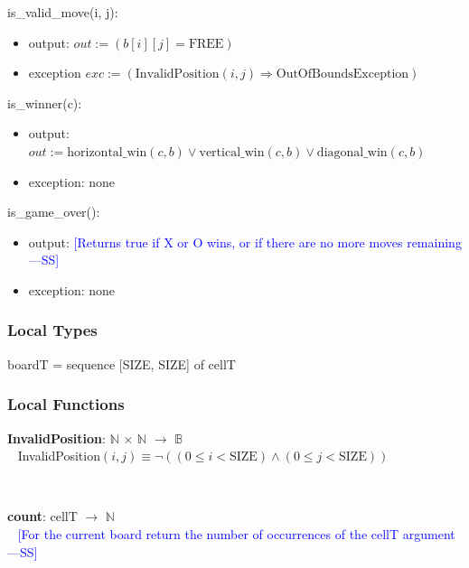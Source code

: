 \documentclass[12pt,fleqn]{examtst}
\newcommand{\authornote}[3]{\textcolor{#1}{[#3 ---#2]}}
\newcommand{\authornote}[3]{}
\newcommand{\wss}[1]{\authornote{blue}{SS}{#1}}
\begin{document}
\noindent is\_valid\_move(i, j):
\begin{itemize}
\item output: $\mathit{out} := (b[i][j] = \mbox{FREE})$ 
\item exception $exc := (\mbox{InvalidPosition}(i, j) \Rightarrow \mbox{OutOfBoundsException})$
\end{itemize}

\noindent is\_winner(c):
\begin{itemize}
\item output: $\mathit{out} := \mbox{horizontal\_win}(c, b) \vee \mbox{vertical\_win}(c, b) \vee
\mbox{diagonal\_win}(c, b)$ 
\item exception: none
\end{itemize}

\noindent is\_game\_over():
\begin{itemize}
\item output: \wss{Returns true if X or O wins, or if there are no more moves remaining}\\

\item exception: none
\end{itemize}

\subsubsection* {Local Types}

boardT = sequence [SIZE, SIZE] of cellT

\subsubsection* {Local Functions}

\noindent \textbf{InvalidPosition}: $\mathbb{N}$ $\times$ $\mathbb{N}$ $\rightarrow$ $\mathbb{B}$\\
~\newline
InvalidPosition$(i, j) \equiv \neg ( ( 0 \leq i < \mbox{SIZE} ) \wedge ( 0 \leq j < \mbox{SIZE}))$

~\newline

\noindent \textbf{count}: cellT $\rightarrow$ $\mathbb{N}$\\
~\newline
\wss{For the current board return the number of occurrences of the cellT
  argument}
~\newline


~\newline
\end{document}
